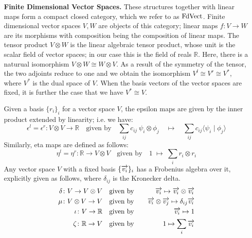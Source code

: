 \medskip
\noindent
{\bf Finite Dimensional Vector Spaces.}
These structures  together with  linear maps  form a compact
closed category, which we refer to as $\mathrm{FdVect}$.  Finite dimensional
vector spaces $V, W$ are objects of this category; linear maps $f
\colon V \to W$ are its morphisms with composition being the
composition of linear maps. The tensor product $V
\otimes W$ is the 
linear algebraic tensor product,
whose unit is the scalar
field of vector spaces; in our case this is the field of reals
$\mathbb{R}$.  Here, there is  a naturual
isomorphism $V \otimes W \cong W \otimes V$. As a result of the
symmetry of the tensor, the two adjoints reduce to one and we obtain the  isomorphism $V^l \cong V^r \cong V^*$, 
where $V^*$ is the dual space of $V$. When the
basis vectors of the vector spaces are fixed, it is further the case
that we have $V^* \cong V$.

%
Given a basis $\{r_i\}_i$ for a vector space $V$, the epsilon maps are
given by the inner product extended by linearity; i.e. we have:
\[
\epsilon^l  =  \epsilon^r \colon   V \otimes V \to \mathbb{R} \quad \mbox{given by} \quad
\sum_{ij} c_{ij} \ \psi_i \otimes \phi_j  \quad \mapsto \quad \sum_{ij} c_{ij} \langle \psi_i \mid \phi_j \rangle\]
Similarly, eta maps   are defined as follows:
\[
\eta^l = \eta^r \colon   \mathbb{R} \to V \otimes V
\quad \mbox{given by} \quad 
1 \; \mapsto \; \sum_i r_i \otimes r_i
\]
Any vector space $V$ with a fixed basis
$\{\overrightarrow{v_i}\}_i$ has a Frobenius algebra over it, explicitly given as follows, where $\delta_{ij}$ is the Kronecker delta.
\begin{eqnarray*}\label{eq:frob}
\delta  \colon V \to V \otimes V  & \quad \mbox{given by} \quad&  \overrightarrow{v_i} \mapsto \overrightarrow{v_i} \otimes \overrightarrow{v_i} \\
\mu \colon V \otimes V \to V  &\quad \mbox{given by} \quad & \overrightarrow{v_i} \otimes \overrightarrow{v_j} \mapsto 
\delta_{ij}\overrightarrow{v_i} \\
  \iota \colon V \to \mathbb{R} & \quad \mbox{given by} \quad&  \overrightarrow{v_i} \mapsto 1 \\
 \zeta \colon \mathbb{R} \to V  &\quad \mbox{given by} \quad& 1 \mapsto   \sum_i  \overrightarrow{v_i}  
\end{eqnarray*}



